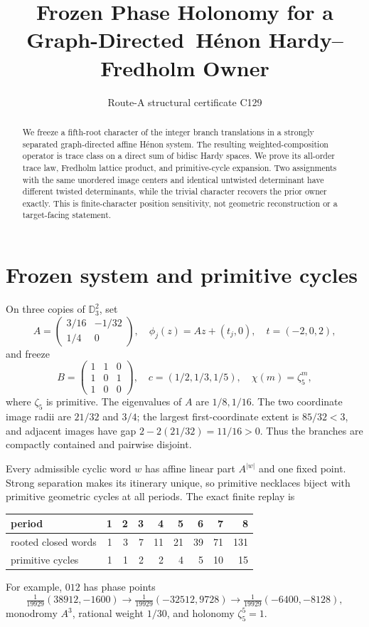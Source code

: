 \documentclass[10pt]{article}
\title{Frozen Phase Holonomy for a Graph-Directed\
H\'enon Hardy--Fredholm Owner}
\author{Route-A structural certificate C129}
\date{}
\begin{document}
\maketitle
\begin{abstract}
We freeze a fifth-root character of the integer branch translations in a
strongly separated graph-directed affine H\'enon system.  The resulting
weighted-composition operator is trace class on a direct sum of bidisc Hardy
spaces.  We prove its all-order trace law, Fredholm lattice product, and
primitive-cycle expansion.  Two assignments with the same unordered image
centers and identical untwisted determinant have different twisted
determinants, while the trivial character recovers the prior owner exactly.
This is finite-character position sensitivity, not geometric reconstruction
or a target-facing statement.
\end{abstract}

\section{Frozen system and primitive cycles}
On three copies of $\mathbb D_3^2$, set
\[
A=\begin{pmatrix}3/16&-1/32\\1/4&0\end{pmatrix},\quad
\phi_j(z)=Az+(t_j,0),\quad t=(-2,0,2),
\]
and freeze
\[
B=\begin{pmatrix}1&1&0\\1&0&1\\1&0&0\end{pmatrix},\quad
c=(1/2,1/3,1/5),\quad
\chi(m)=\zeta_5^m,
\]
where $\zeta_5$ is primitive.  The eigenvalues of $A$ are $1/8,1/16$.
The two coordinate image radii are $21/32$ and $3/4$; the largest
first-coordinate extent is $85/32<3$, and adjacent images have gap
$2-2(21/32)=11/16>0$.  Thus the branches are compactly contained and
pairwise disjoint.

Every admissible cyclic word $w$ has affine linear part $A^{|w|}$ and one
fixed point.  Strong separation makes its itinerary unique, so primitive
necklaces biject with primitive geometric cycles at all periods.  The exact
finite replay is
\begin{center}
\begin{tabular}{@{}lrrrrrrrr@{}}
\toprule
period &1&2&3&4&5&6&7&8\\
\midrule
rooted closed words &1&3&7&11&21&39&71&131\\
primitive cycles &1&1&2&2&4&5&10&15\\
\bottomrule
\end{tabular}
\end{center}
For example, $012$ has phase points
\[
\tfrac1{19929}(38912,-1600)\to
\tfrac1{19929}(-32512,9728)\to
\tfrac1{19929}(-6400,-8128),
\]
monodromy $A^3$, rational weight $1/30$, and holonomy $\zeta_5^{5}=1$.
\end{document}
